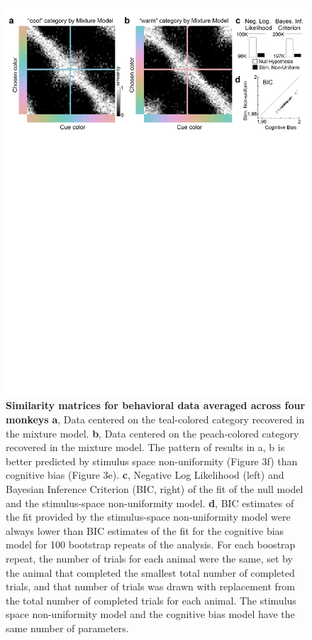 \begin{figure}
    \begin{fullwidth}
    \centering
    \includegraphics[width=\textwidth+4cm,trim={0 19cm 0 0},clip]{../Figures/flat/F4_TCCResults_3.jpg}
    \caption{\textbf{Similarity matrices for behavioral data averaged across four monkeys}
    \textbf{a}, Data centered on the teal-colored category recovered in the mixture model.  
	\textbf{b}, Data centered on the peach-colored category recovered in the mixture model. The pattern of results in a, b is better predicted by stimulus space non-uniformity (Figure 3f) than cognitive bias (Figure 3e). 
	\textbf{c}, Negative Log Likelihood (left) and Bayesian Inference Criterion (BIC, right) of the fit of the null model and the stimulus-space non-uniformity model. 
	\textbf{d}, BIC estimates of the fit provided by the stimulus-space non-uniformity model were always lower than BIC estimates of the fit for the cognitive bias model for 100 bootstrap repeats of the analysis. For each boostrap repeat, the number of trials for each animal were the same, set by the animal that completed the smallest total number of completed trials, and that number of trials was drawn with replacement from the total number of completed trials for each animal. The stimulus space non-uniformity model and the cognitive bias model have the same number of parameters. 
    } 
    \label{fig:TCCOutput}
    \end{fullwidth}
\end{figure}

